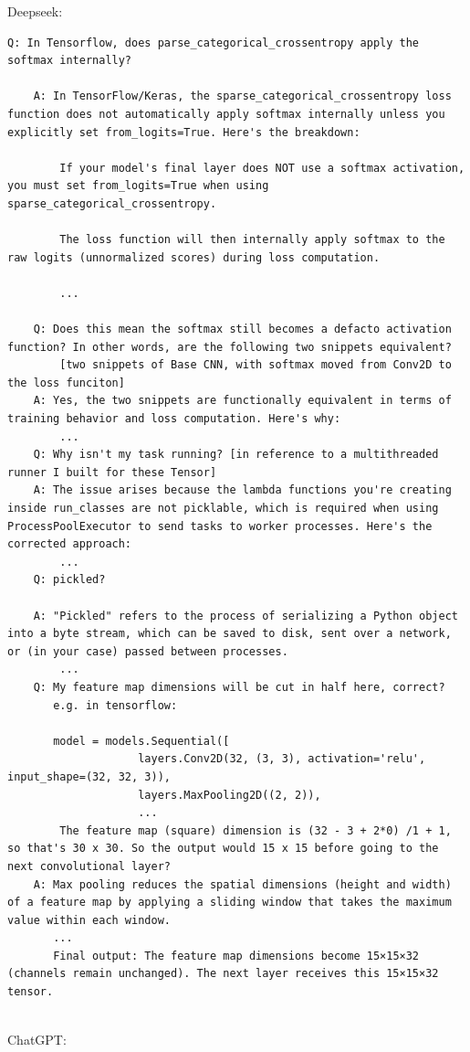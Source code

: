 \documentclass{article}
\begin{document}
    Deepseek:
    \begin{lstlisting}[language=none,label={lst:consultation1}]
    Q: In Tensorflow, does parse_categorical_crossentropy apply the softmax internally?

    A: In TensorFlow/Keras, the sparse_categorical_crossentropy loss function does not automatically apply softmax internally unless you explicitly set from_logits=True. Here's the breakdown:

        If your model's final layer does NOT use a softmax activation, you must set from_logits=True when using sparse_categorical_crossentropy.

        The loss function will then internally apply softmax to the raw logits (unnormalized scores) during loss computation.

        ...

    Q: Does this mean the softmax still becomes a defacto activation function? In other words, are the following two snippets equivalent?
        [two snippets of Base CNN, with softmax moved from Conv2D to the loss funciton]
    A: Yes, the two snippets are functionally equivalent in terms of training behavior and loss computation. Here's why:
        ...
    Q: Why isn't my task running? [in reference to a multithreaded runner I built for these Tensor]
    A: The issue arises because the lambda functions you're creating inside run_classes are not picklable, which is required when using ProcessPoolExecutor to send tasks to worker processes. Here's the corrected approach:
        ...
    Q: pickled?

    A: "Pickled" refers to the process of serializing a Python object into a byte stream, which can be saved to disk, sent over a network, or (in your case) passed between processes.
        ...
    Q: My feature map dimensions will be cut in half here, correct?
       e.g. in tensorflow:

       model = models.Sequential([
                    layers.Conv2D(32, (3, 3), activation='relu', input_shape=(32, 32, 3)),
                    layers.MaxPooling2D((2, 2)),
                    ...
        The feature map (square) dimension is (32 - 3 + 2*0) /1 + 1, so that's 30 x 30. So the output would 15 x 15 before going to the next convolutional layer?
    A: Max pooling reduces the spatial dimensions (height and width) of a feature map by applying a sliding window that takes the maximum value within each window.
       ...
       Final output: The feature map dimensions become 15×15×32 (channels remain unchanged). The next layer receives this 15×15×32 tensor.


    \end{lstlisting}
    ChatGPT:
\end{document}
